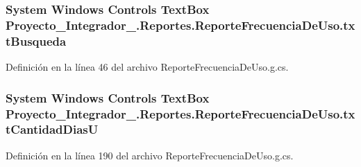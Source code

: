 \hypertarget{class_proyecto___integrador__3_1_1_reportes_1_1_reporte_frecuencia_de_uso_a6f91eb77ee76d84a4dbf8eaedb2d8497}{
\subsubsection[{txt\-Busqueda}]{\setlength{\rightskip}{0pt plus 5cm}System Windows Controls Text\-Box Proyecto\-\_\-\-Integrador\-\_.\-Reportes.\-Reporte\-Frecuencia\-De\-Uso.\-txt\-Busqueda\hspace{0.3cm}{\ttfamily [package]}}}\label{class_proyecto___integrador__3_1_1_reportes_1_1_reporte_frecuencia_de_uso_a6f91eb77ee76d84a4dbf8eaedb2d8497}


Definición en la línea 46 del archivo Reporte\-Frecuencia\-De\-Uso.\-g.\-cs.

\hypertarget{class_proyecto___integrador__3_1_1_reportes_1_1_reporte_frecuencia_de_uso_a939dae08740f0d01990fe4ceea680731}{
\subsubsection[{txt\-Cantidad\-Dias\-U}]{\setlength{\rightskip}{0pt plus 5cm}System Windows Controls Text\-Box Proyecto\-\_\-\-Integrador\-\_.\-Reportes.\-Reporte\-Frecuencia\-De\-Uso.\-txt\-Cantidad\-Dias\-U\hspace{0.3cm}{\ttfamily [package]}}}\label{class_proyecto___integrador__3_1_1_reportes_1_1_reporte_frecuencia_de_uso_a939dae08740f0d01990fe4ceea680731}


Definición en la línea 190 del archivo Reporte\-Frecuencia\-De\-Uso.\-g.\-cs.

